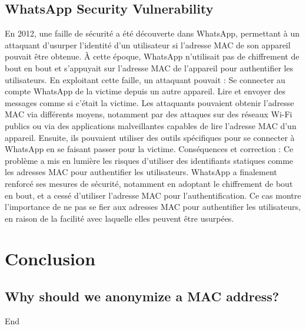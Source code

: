 \documentclass[aps,prb,twocolumn,superscriptaddress,floatfix,longbibliography,nofootinbib]{revtex4-2}
\begin{document}
  \subsection{\label{subsec:WhatsApp}WhatsApp Security Vulnerability}

En 2012, une faille de sécurité a été découverte dans WhatsApp, permettant à un attaquant d'usurper l'identité d'un utilisateur si l'adresse MAC de son appareil pouvait être obtenue. À cette époque, WhatsApp n’utilisait pas de chiffrement de bout en bout et s’appuyait sur l’adresse MAC de l’appareil pour authentifier les utilisateurs. En exploitant cette faille, un attaquant pouvait :
    Se connecter au compte WhatsApp de la victime depuis un autre appareil.
    Lire et envoyer des messages comme si c’était la victime.
Les attaquants pouvaient obtenir l'adresse MAC via différents moyens, notamment par des attaques sur des réseaux Wi-Fi publics ou via des applications malveillantes capables de lire l'adresse MAC d'un appareil. Ensuite, ils pouvaient utiliser des outils spécifiques pour se connecter à WhatsApp en se faisant passer pour la victime.
Conséquences et correction :
Ce problème a mis en lumière les risques d'utiliser des identifiants statiques comme les adresses MAC pour authentifier les utilisateurs. WhatsApp a finalement renforcé ses mesures de sécurité, notamment en adoptant le chiffrement de bout en bout, et a cessé d’utiliser l’adresse MAC pour l’authentification.
Ce cas montre l'importance de ne pas se fier aux adresses MAC pour authentifier les utilisateurs, en raison de la facilité avec laquelle elles peuvent être usurpées.




\section{\label{sec:Conclusion}Conclusion}
  \subsection{\label{sec:Why}Why should we anonymize a MAC address?}

End



\end{document}
